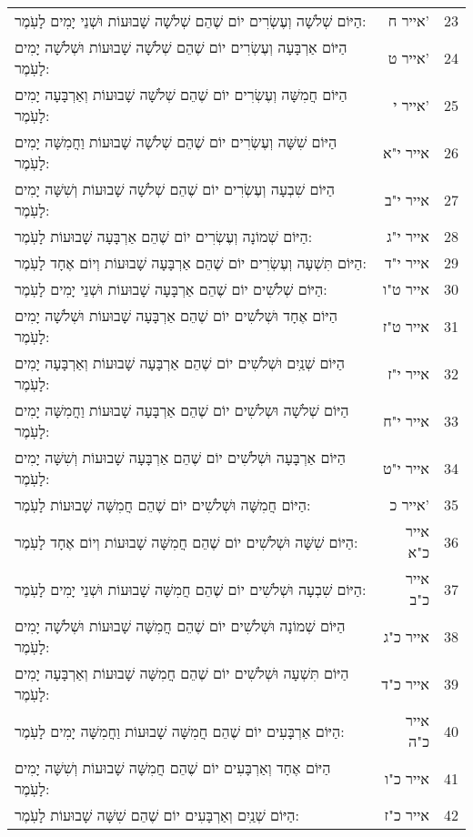 \documentclass[twoside, openany, parskip=half, 11pt]{book}
\begin{document}
\begin{scriptsize}
\begin{longtable}{p{} | r | l}
 	הַיּוֹם שְׁלֹשָׁה וְעֶשְׂרִים יוֹם שֶׁהֵם שְׁלֹשָׁה שָׁבוּעוֹת וּשְׁנֵי יָמִים לָעֹֽמֶר:& אייר ח' & 23 \\
 	הַיּוֹם אַרְבָּעָה וְעֶשְׂרִים יוֹם שֶׁהֵם שְׁלֹשָׁה שָׁבוּעוֹת וּשְׁלֹשָׁה יָמִים לָעֹֽמֶר:& אייר ט' & 24 \\
	הַיּוֹם חֲמִשָּׁה וְעֶשְׂרִים יוֹם שֶׁהֵם שְׁלֹשָׁה שָׁבוּעוֹת וְאַרְבָּעָה יָמִים לָעֹֽמֶר:&אייר י' & 25 \\
	הַיּוֹם שִׁשָּׁה וְעֶשְׂרִים יוֹם שֶׁהֵם שְׁלֹשָׁה שָׁבוּעוֹת וַחֲמִשָּׁה יָמִים לָעֹֽמֶר:&אייר י"א &26 \\
	 הַיּוֹם שִׁבְעָה וְעֶשְׂרִים יוֹם שֶׁהֵם שְׁלֹשָׁה שָׁבוּעוֹת וְשִׁשָּׁה יָמִים לָעֹֽמֶר:&אייר י"ב & 27 \\
 	הַיּוֹם שְׁמוֹנָה וְעֶשְׂרִים יוֹם שֶׁהֵם אַרְבָּעָה שָׁבוּעוֹת לָעֹֽמֶר:&אייר י"ג & 28 \\
	הַיּוֹם תִּשְׁעָה וְעֶשְׂרִים יוֹם שֶׁהֵם אַרְבָּעָה שָׁבוּעוֹת וְיוֹם אֶחָד לָעֹֽמֶר:&אייר י"ד & 29 \\
	הַיּוֹם שְׁלֹשִׁים יוֹם שֶׁהֵם אַרְבָּעָה שָׁבוּעוֹת וּשְׁנֵי יָמִים לָעֹֽמֶר:& אייר ט"ו & 30 \\
 הַיּוֹם אֶחָד וּשְׁלֹשִׁים יוֹם שֶׁהֵם אַרְבָּעָה שָׁבוּעוֹת וּשְׁלֹשָׁה יָמִים לָעֹֽמֶר:&אייר ט"ז & 31 \\
	הַיּוֹם שְׁנַֽיִם וּשְׁלֹשִׁים יוֹם שֶׁהֵם אַרְבָּעָה שָׁבוּעוֹת וְאַרְבָּעָה יָמִים לָעֹֽמֶר:&אייר י"ז & 32 \\
	הַיּוֹם שְׁלֹשָׁה וּשְלֹשִׁים יוֹם שֶׁהֵם אַרְבָּעָה שָׁבוּעוֹת וַחֲמִשָּׁה יָמִים לָעֹֽמֶר:& אייר י"ח & 33 \\
	הַיּוֹם אַרְבָּעָה וּשְׁלֹשִׁים יוֹם שֶׁהֵם אַרְבָּעָה שָׁבוּעוֹת וְשִׁשָּׁה יָמִים לָעֹֽמֶר:&אייר י"ט & 34 \\
 	הַיּוֹם חֲמִשָּׁה וּשְׁלֹשִׁים יוֹם שֶׁהֵם חֲמִשָּׁה שָׁבוּעוֹת לָעֹֽמֶר:&אייר כ' & 35 \\
	הַיּוֹם שִׁשָּׁה וּשְׁלֹשִׁים יוֹם שֶׁהֵם חֲמִשָּׁה שָׁבוּעוֹת וְיוֹם אֶחָד לָעֹֽמֶר:&אייר כ"א & 36 \\
 הַיּוֹם שִׁבְעָה וּשְׁלֹשִׁים יוֹם שֶׁהֵם חֲמִשָּׁה שָׁבוּעוֹת וּשְׁנֵי יָמִים לָעֹֽמֶר:& אייר כ"ב & 37 \\
 הַיּוֹם שְׁמוֹנָה וּשְׁלֹשִׁים יוֹם שֶׁהֵם חֲמִשָּׁה שָׁבוּעוֹת וּשְׁלֹשָׁה יָמִים לָעֹֽמֶר:& אייר כ"ג & 38 \\
	הַיּוֹם תִּשְׁעָה וּשְׁלֹשִׁים יוֹם שֶׁהֵם חֲמִשָּׁה שָׁבוּעוֹת וְאַרְבָּעָה יָמִים לָעֹֽמֶר:& אייר כ"ד & 39 \\
	הַיּוֹם אַרְבָּעִים יוֹם שֶׁהֵם חֲמִשָּׁה שָׁבוּעוֹת וַחֲמִשָּׁה יָמִים לָעֹֽמֶר:& אייר כ"ה & 40 \\
הַיּוֹם אֶחָד וְאַרְבָּעִים יוֹם שֶׁהֵם חֲמִשָּׁה שָׁבוּעוֹת וְשִׁשָּׁה יָמִים לָעֹֽמֶר:& אייר כ"ו & 41 \\
	הַיּוֹם שְׁנַֽיִם וְאַרְבָּעִים יוֹם שֶׁהֵם שִׁשָּׁה שָׁבוּעוֹת לָעֹֽמֶר:&אייר כ"ז & 42 \\

\end{longtable}
\end{scriptsize}
\end{document}
